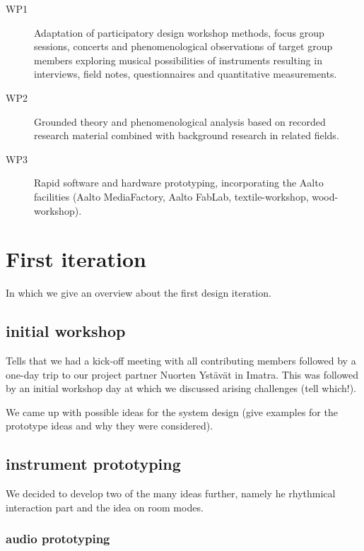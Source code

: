 \documentclass{chi-ext}
\begin{document}
\begin{multicols}{2}
\begin{description}
	\item[WP1] Adaptation of participatory design workshop methods, focus group sessions, concerts and phenomenological observations of target group members exploring musical possibilities of instruments resulting in interviews, field notes, questionnaires and quantitative measurements.
	\item[WP2] Grounded theory and phenomenological analysis based on recorded research material combined with background research in related fields.
	\item[WP3] Rapid software and hardware prototyping, incorporating the Aalto facilities (Aalto MediaFactory, Aalto FabLab, textile-workshop, wood-workshop).
\end{description}





\section{First iteration}
\label{sec:first_iteration}

In which we give an overview about the first design iteration.

\subsection{initial workshop}
\label{sub:initial_workshop}

Tells that we had a kick-off meeting with all contributing members followed by a one-day trip to our project partner Nuorten Ystävät in Imatra.
This was followed by an initial workshop day at which we discussed arising challenges (tell which!).

We came up with possible ideas for the system design (give examples for the prototype ideas and why they were considered).


\subsection{instrument prototyping}
\label{sub:instrument_prototyping}

We decided to develop two of the many ideas further, namely he rhythmical interaction part and the idea on room modes.

\subsubsection{audio prototyping}
\label{ssub:audio_prototyping}


\end{multicols}
\end{document}
